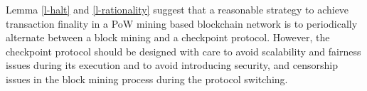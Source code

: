 Lemma \ref{l-halt} and \ref{l-rationality} suggest that a reasonable strategy to achieve transaction finality in a PoW mining based blockchain network is to periodically alternate between a block mining and a checkpoint protocol. However, the checkpoint protocol should be designed with care to avoid scalability and fairness issues during its execution and to avoid introducing security, and censorship issues in the block mining process during the protocol switching.     

